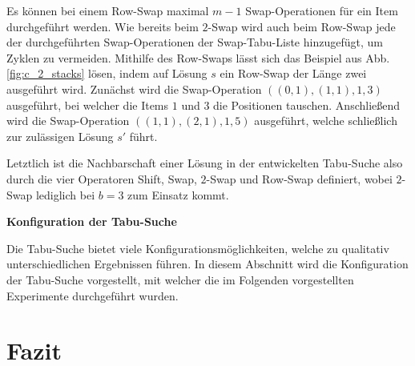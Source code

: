 \vfill
\pagebreak

Es können bei einem Row-Swap maximal $m - 1$ Swap-Operationen für ein Item durchgeführt werden.
Wie bereits beim $2$-Swap wird auch beim Row-Swap jede der durchgeführten Swap-Operationen der Swap-Tabu-Liste hinzugefügt,
um Zyklen zu vermeiden. Mithilfe des Row-Swaps lässt sich das Beispiel aus Abb. \ref{fig:c_2_stacks} lösen,
indem auf Lösung $s$ ein Row-Swap der Länge zwei ausgeführt wird.
Zunächst wird die Swap-Operation $((0, 1), (1, 1), 1, 3)$ ausgeführt, bei welcher die Items $1$ und $3$
die Positionen tauschen. Anschließend wird die Swap-Operation $((1, 1), (2, 1), 1, 5)$ ausgeführt,
welche schließlich zur zulässigen Lösung $s'$ führt.

Letztlich ist die Nachbarschaft einer Lösung in der entwickelten Tabu-Suche also durch die vier Operatoren
Shift, Swap, $2$-Swap und Row-Swap definiert, wobei $2$-Swap lediglich bei $b = 3$ zum Einsatz kommt.


\vfill
\pagebreak

\textbf{Konfiguration der Tabu-Suche}\newline


Die Tabu-Suche bietet viele Konfigurationsmöglichkeiten, welche zu qualitativ unterschiedlichen
Ergebnissen führen. In diesem Abschnitt wird die Konfiguration der Tabu-Suche vorgestellt,
mit welcher die im Folgenden vorgestellten Experimente durchgeführt wurden.


\vfill

\pagebreak

\section{Fazit}
\label{sec:conclusion}
